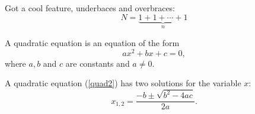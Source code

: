 Got a cool feature, underbaces and overbraces:
\[
N = \underbrace{1 + 1 + \cdots + 1}_n
\]

\begin{dfn}
A quadratic equation is an equation of the form
  \begin{equation} \label{quad2}
    ax^2 + bx + c = 0,
  \end{equation}
  where \( a, b \) and \( c \) are constants and \( a \neq 0 \).
\end{dfn}

\begin{thm}
A quadratic equation (\ref{quad2}) has two solutions for the variable
\( x \):
\begin{equation}
 \label{root}
 x_{1,2} = \frac{-b \pm \sqrt{b^2-4ac}}{2a}.
\end{equation}
\end{thm}
